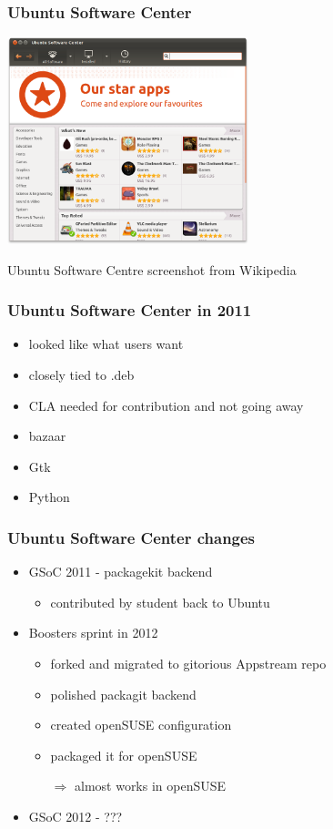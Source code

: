 \documentclass{beamer}
\begin{document}
\begin{frame}[t]
\frametitle{Ubuntu Software Center}
\begin{center}
\includegraphics[height=6cm]{sw_centre}

\small Ubuntu Software Centre screenshot from Wikipedia
\end{center}
\end{frame}

\begin{frame}[t]
\frametitle{Ubuntu Software Center in 2011}
\begin{itemize}
\item looked like what users want
\item closely tied to .deb
\item CLA needed for contribution and not going away
\item bazaar
\item Gtk
\item Python
\end{itemize}
\end{frame}

\begin{frame}[t]
\frametitle{Ubuntu Software Center changes}
\begin{itemize}
\item GSoC 2011 - packagekit backend
\begin{itemize}
\item contributed by student back to Ubuntu
\end{itemize}
\item Boosters sprint in 2012
\begin{itemize}
\item forked and migrated to gitorious Appstream repo
\item polished packagit backend
\item created openSUSE configuration
\item packaged it for openSUSE
\item[\(\Rightarrow\)] almost works in openSUSE
\end{itemize}
\item GSoC 2012 - ???
\end{itemize}
\end{frame}
\end{document}
